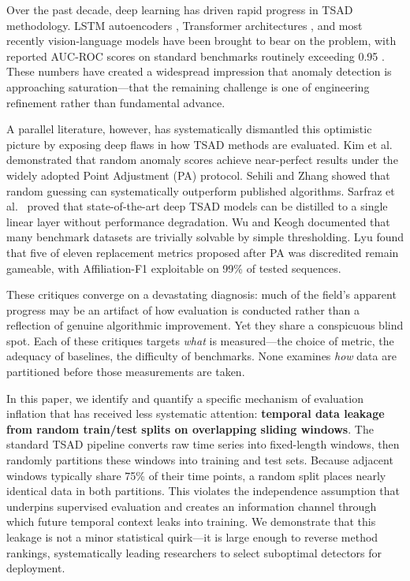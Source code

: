 \documentclass[preprint,12pt]{elsarticle}
\begin{document}
Over the past decade, deep learning has driven rapid progress in TSAD methodology. LSTM autoencoders \cite{malhotra2016lstm}, Transformer architectures \cite{xu2022anomaly}, and most recently vision-language models \cite{park2025delving,he2025vlm4ts} have been brought to bear on the problem, with reported AUC-ROC scores on standard benchmarks routinely exceeding 0.95 \cite{darban2022deep}. These numbers have created a widespread impression that anomaly detection is approaching saturation---that the remaining challenge is one of engineering refinement rather than fundamental advance.

A parallel literature, however, has systematically dismantled this optimistic picture by exposing deep flaws in how TSAD methods are evaluated. Kim et al.\ \cite{kim2022towards} demonstrated that random anomaly scores achieve near-perfect results under the widely adopted Point Adjustment (PA) protocol. Sehili and Zhang \cite{sehili2023multivariate} showed that random guessing can systematically outperform published algorithms. Sarfraz et al.\ \cite{sarfraz2024position} proved that state-of-the-art deep TSAD models can be distilled to a single linear layer without performance degradation. Wu and Keogh \cite{wu2021current} documented that many benchmark datasets are trivially solvable by simple thresholding. Lyu \cite{lyu2025didwe} found that five of eleven replacement metrics proposed after PA was discredited remain gameable, with Affiliation-F1 exploitable on 99\% of tested sequences.

These critiques converge on a devastating diagnosis: much of the field's apparent progress may be an artifact of how evaluation is conducted rather than a reflection of genuine algorithmic improvement. Yet they share a conspicuous blind spot. Each of these critiques targets \emph{what} is measured---the choice of metric, the adequacy of baselines, the difficulty of benchmarks. None examines \emph{how} data are partitioned before those measurements are taken.

In this paper, we identify and quantify a specific mechanism of evaluation inflation that has received less systematic attention: \textbf{temporal data leakage from random train/test splits on overlapping sliding windows}. The standard TSAD pipeline converts raw time series into fixed-length windows, then randomly partitions these windows into training and test sets. Because adjacent windows typically share 75\% of their time points, a random split places nearly identical data in both partitions. This violates the independence assumption that underpins supervised evaluation and creates an information channel through which future temporal context leaks into training. We demonstrate that this leakage is not a minor statistical quirk---it is large enough to reverse method rankings, systematically leading researchers to select suboptimal detectors for deployment.
\end{document}
